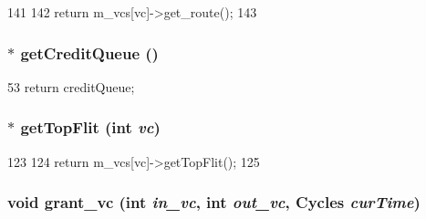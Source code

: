 \begin{DoxyCode}
141     {
142         return m_vcs[vc]->get_route();
143     }
\end{DoxyCode}
\hypertarget{classInputUnit__d_ae77ac4bed244a5b246b4de1053e35949}{
\subsubsection[{getCreditQueue}]{$\ast$ getCreditQueue ()}}
\label{classInputUnit__d_ae77ac4bed244a5b246b4de1053e35949}



\begin{DoxyCode}
53 { return creditQueue; }
\end{DoxyCode}
\hypertarget{classInputUnit__d_a3ca1c95b6303e0ddfe2e016a8d2bd4b4}{
\subsubsection[{getTopFlit}]{$\ast$ getTopFlit (int {\em vc})}}
\label{classInputUnit__d_a3ca1c95b6303e0ddfe2e016a8d2bd4b4}



\begin{DoxyCode}
123     {
124         return m_vcs[vc]->getTopFlit();
125     }
\end{DoxyCode}
\hypertarget{classInputUnit__d_ae8228408b44a2088e7aa6fac6548f09c}{
\subsubsection[{grant\_\-vc}]{\setlength{\rightskip}{0pt plus 5cm}void grant\_\-vc (int {\em in\_\-vc}, \/  int {\em out\_\-vc}, \/  {\bf Cycles} {\em curTime})}}
\label{classInputUnit__d_ae8228408b44a2088e7aa6fac6548f09c}



